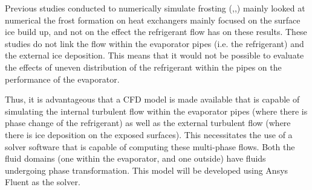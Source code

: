 \documentclass[11pt,a4paper,twoside,oneside]{article}
\begin{document}
Previous studies conducted to numerically simulate frosting (\cite{Afra},\cite{chalmers1},\cite{hmt08}) mainly looked at numerical the frost formation on heat exchangers mainly focused on the surface ice build up, and not on the effect the refrigerant flow has on these results. These studies do not link the flow within the evaporator pipes (i.e. the refrigerant) and the external ice deposition. This means that it would not be possible to evaluate the effects of uneven distribution of the refrigerant within the pipes on the performance of the evaporator.

Thus, it is advantageous that a CFD model is made available that is capable of simulating the internal turbulent flow within the evaporator pipes (where there is phase change of the refrigerant) as well as the external turbulent flow (where there is ice deposition on the exposed surfaces). This necessitates the use of a solver software that is capable of computing these multi-phase flows. Both the fluid domains (one within the evaporator, and one outside) have fluids undergoing phase transformation. This model will be developed using Ansys Fluent as the solver. 


\end{document}
